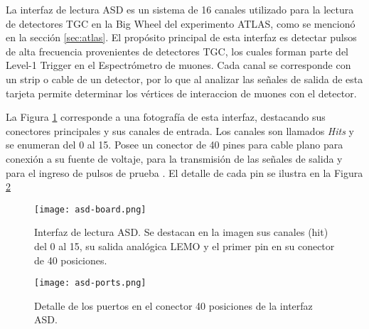La interfaz de lectura ASD\cite{1999ATLASICs} es un sistema de 16 canales utilizado para la lectura de detectores TGC en la Big Wheel del experimento ATLAS, como se mencionó en la sección \ref{sec:atlas}. El propósito principal de esta interfaz es detectar pulsos de alta frecuencia provenientes de detectores TGC, los cuales forman parte del Level-1 Trigger en el Espectrómetro de muones. Cada canal se corresponde con un strip o cable de un detector, por lo que al analizar las señales de salida de esta tarjeta permite determinar los vértices de interaccion  de muones con el detector.

La Figura \ref{img:asd-board} corresponde a una fotografía de esta interfaz, destacando sus conectores principales y sus canales de entrada. Los canales son llamados \textit{Hits} y se enumeran del 0 al 15. Posee  un conector de 40 pines para cable plano para conexión a su fuente de voltaje, para la transmisión de las señales de salida y para el ingreso de pulsos de prueba . El detalle de cada pin se ilustra en la Figura \ref{img:asd-ports}   

\begin{figure}[h]
	\centering
	\texttt{[image: asd-board.png]}
	\caption{Interfaz de lectura ASD. Se destacan en la imagen sus canales (hit) del 0 al 15, su salida analógica LEMO y el primer pin en su conector de 40 posiciones.}
	\label{img:asd-board}
\end{figure}

\begin{figure}[h]
	\centering
	\texttt{[image: asd-ports.png]}
	\caption{Detalle de los puertos en el conector 40 posiciones de la interfaz ASD.}
	\label{img:asd-ports}
\end{figure}

